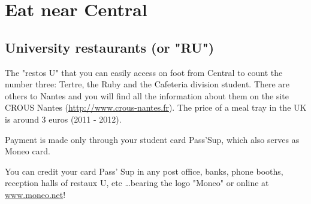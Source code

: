 \section{Eat near Central}

\subsection{University restaurants (or "RU")}


The "restos U" that you can easily access on foot from Central to count the number three: Tertre, the Ruby and the Cafeteria division student. There are others to Nantes and you will find all the information about them on the site CROUS Nantes (\url{http://www.crous-nantes.fr}). The price of a meal tray in the UK is around 3 euros (2011 - 2012).

Payment is made only through your student card Pass'Sup, which also serves as Moneo card.

You can credit your card Pass' Sup in any post office, banks, phone booths, reception halls of restaux U, etc \dots bearing the logo "Moneo" or online at \url{www.moneo.net}!

